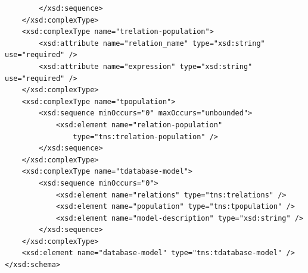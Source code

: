 \begin{Verbatim}
		</xsd:sequence>
	</xsd:complexType>
	<xsd:complexType name="trelation-population">
		<xsd:attribute name="relation_name" type="xsd:string" use="required" />
		<xsd:attribute name="expression" type="xsd:string" use="required" />
	</xsd:complexType>
	<xsd:complexType name="tpopulation">
		<xsd:sequence minOccurs="0" maxOccurs="unbounded">
			<xsd:element name="relation-population" 
				type="tns:trelation-population" />
		</xsd:sequence>
	</xsd:complexType>
	<xsd:complexType name="tdatabase-model">
		<xsd:sequence minOccurs="0">
			<xsd:element name="relations" type="tns:trelations" />
			<xsd:element name="population" type="tns:tpopulation" />
			<xsd:element name="model-description" type="xsd:string" />
		</xsd:sequence>
	</xsd:complexType>
	<xsd:element name="database-model" type="tns:tdatabase-model" />
</xsd:schema>
\end{Verbatim}

